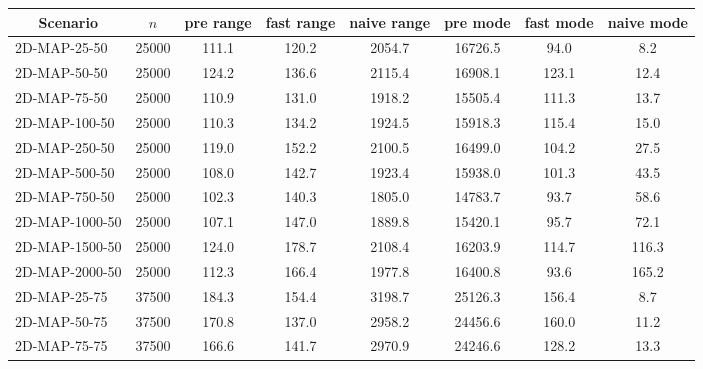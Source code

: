 \documentclass{article}
\begin{document}
    \begin{table}[h]
        \begin{center}
        \begin{tabular}{|l||c|c|c|c|c|c|c|}
            \hline
            \multicolumn{1}{|c|}{Scenario} & $n$   & pre range & fast range & naive range & pre mode & fast mode & naive mode \\
            \hline
            \hline
            2D-MAP-25-50                   & 25000 & 111.1     & 120.2      & 2054.7      & 16726.5  & 94.0      & 8.2        \\
            2D-MAP-50-50                   & 25000 & 124.2     & 136.6      & 2115.4      & 16908.1  & 123.1     & 12.4       \\
            2D-MAP-75-50                   & 25000 & 110.9     & 131.0      & 1918.2      & 15505.4  & 111.3     & 13.7       \\
            2D-MAP-100-50                  & 25000 & 110.3     & 134.2      & 1924.5      & 15918.3  & 115.4     & 15.0       \\
            2D-MAP-250-50                  & 25000 & 119.0     & 152.2      & 2100.5      & 16499.0  & 104.2     & 27.5       \\
            2D-MAP-500-50                  & 25000 & 108.0     & 142.7      & 1923.4      & 15938.0  & 101.3     & 43.5       \\
            2D-MAP-750-50                  & 25000 & 102.3     & 140.3      & 1805.0      & 14783.7  & 93.7      & 58.6       \\
            2D-MAP-1000-50                 & 25000 & 107.1     & 147.0      & 1889.8      & 15420.1  & 95.7      & 72.1       \\
            2D-MAP-1500-50                 & 25000 & 124.0     & 178.7      & 2108.4      & 16203.9  & 114.7     & 116.3      \\
            2D-MAP-2000-50                 & 25000 & 112.3     & 166.4      & 1977.8      & 16400.8  & 93.6      & 165.2      \\
            \hline
            2D-MAP-25-75                   & 37500 & 184.3     & 154.4      & 3198.7      & 25126.3  & 156.4     & 8.7        \\
            2D-MAP-50-75                   & 37500 & 170.8     & 137.0      & 2958.2      & 24456.6  & 160.0     & 11.2       \\
            2D-MAP-75-75                   & 37500 & 166.6     & 141.7      & 2970.9      & 24246.6  & 128.2     & 13.3       \\

\end{tabular}
\end{center}
\end{table}
\end{document}
